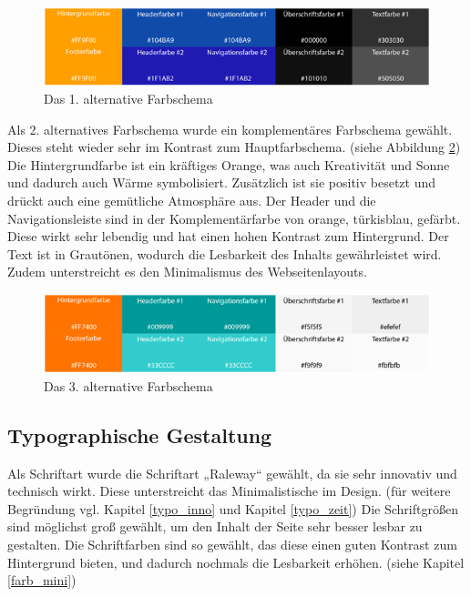 \begin{figure} [hp]
	\includegraphics[width=\textwidth]{./img/mini_farb2.png}
	\caption{Das 1. alternative Farbschema }
	\label{mini_farb2}
\end{figure}

Als 2. alternatives Farbschema wurde ein komplementäres Farbschema gewählt. Dieses steht wieder sehr im Kontrast zum Hauptfarbschema. (siehe Abbildung \ref{mini_farb3})
Die Hintergrundfarbe ist ein kräftiges Orange, was auch Kreativität und Sonne und dadurch auch Wärme symbolisiert. Zusätzlich ist sie positiv besetzt und drückt auch eine gemütliche Atmosphäre aus.
Der Header und die Navigationsleiste sind in der Komplementärfarbe von orange, türkisblau,  gefärbt. Diese wirkt sehr lebendig und hat einen hohen Kontrast zum Hintergrund.
Der Text ist in Grautönen, wodurch die Lesbarkeit des Inhalts gewährleistet wird. Zudem unterstreicht es den Minimalismus des Webseitenlayouts.

\begin{figure} [hp]
\includegraphics[width=\textwidth]{./img/mini_farb3.png}
\caption{Das 3. alternative Farbschema }
\label{mini_farb3}
\end{figure}

	\subsection{Typographische Gestaltung}\label{chapter:mini:typo}

Als Schriftart wurde die Schriftart „Raleway“ gewählt, da sie sehr innovativ und technisch wirkt. Diese unterstreicht das Minimalistische im Design. (für weitere Begründung vgl. Kapitel \ref{typo_inno} und Kapitel \ref{typo_zeit})
Die Schriftgrößen sind möglichst groß gewählt, um den Inhalt der Seite sehr besser lesbar zu gestalten.
Die Schriftfarben sind so gewählt, das diese einen guten Kontrast zum Hintergrund bieten, und dadurch nochmals die Lesbarkeit erhöhen. (siehe Kapitel \ref{farb_mini})


